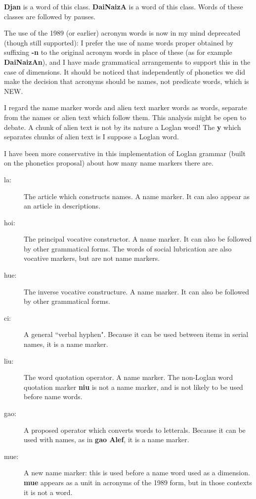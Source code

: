 \documentclass[12pt]{book}
\begin{document}
{\bf Djan} is a word of this class.  {\bf DaiNaizA} is a word of this class.  Words of these classes are followed by pauses.

 The use of the 1989 (or earlier) acronym words is now in my mind deprecated
(though still supported):  I prefer the use of name words proper obtained by suffixing {\bf -n} to the original acronym words in place of these (as for example {\bf DaiNaizAn}), and I have made grammatical arrangements to support this in the case of dimensions.  It should be noticed that independently of phonetics we did make the decision that acronyms should be names, not predicate words, which is NEW.

I regard the name marker words and alien text marker words as words, separate from the names or alien text  which follow them.  This analysis might be open to debate.  A chunk of alien text is not by its nature a Loglan word!  The {\bf y} which separates chunks of alien text is I suppose a Loglan word.

I have been more conservative in this implementation of Loglan grammar (built on the phonetics proposal) about how many name markers there are.

\begin{description}

\item[la:]  The article which constructs names.  A name marker.  It can also appear as an article in descriptions.

\item[hoi:]  The principal vocative constructor.  A name marker.  It can also be followed by other grammatical forms.  The words of social lubrication are also vocative markers, but are not name markers.

\item[hue:]  The inverse vocative constructure.  A name marker.  It can also be followed by other grammatical forms.

\item[ci:]  A general ``verbal hyphen".  Because it can be used between items in serial names, it is a name marker.  

\item[liu:]  The word quotation operator.  A name marker.  The non-Loglan word quotation marker {\bf niu} is not a name marker, and is not likely to be used before name words.

\item[gao:]  A proposed operator which converts words to letterals.  Because it can be used with names, as in {\bf gao Alef}, it is a name marker.

\item[mue:]  A new name marker:  this is used before a name word used as a dimension.  {\bf mue} appears as a unit in acronyms of the 1989 form, but in those contexts it is not a word.

\end{description}
\end{document}
